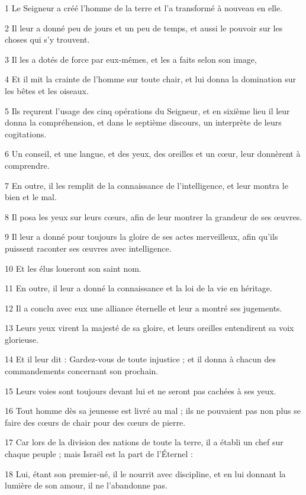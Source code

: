 \par 1 Le Seigneur a créé l'homme de la terre et l'a transformé à nouveau en elle.
\par 2 Il leur a donné peu de jours et un peu de temps, et aussi le pouvoir sur les choses qui s'y trouvent.
\par 3 Il les a dotés de force par eux-mêmes, et les a faits selon son image,
\par 4 Et il mit la crainte de l'homme sur toute chair, et lui donna la domination sur les bêtes et les oiseaux.
\par 5 Ils reçurent l'usage des cinq opérations du Seigneur, et en sixième lieu il leur donna la compréhension, et dans le septième discours, un interprète de leurs cogitations.
\par 6 Un conseil, et une langue, et des yeux, des oreilles et un cœur, leur donnèrent à comprendre.
\par 7 En outre, il les remplit de la connaissance de l'intelligence, et leur montra le bien et le mal.
\par 8 Il posa les yeux sur leurs cœurs, afin de leur montrer la grandeur de ses œuvres.
\par 9 Il leur a donné pour toujours la gloire de ses actes merveilleux, afin qu'ils puissent raconter ses œuvres avec intelligence.
\par 10 Et les élus loueront son saint nom.
\par 11 En outre, il leur a donné la connaissance et la loi de la vie en héritage.
\par 12 Il a conclu avec eux une alliance éternelle et leur a montré ses jugements.
\par 13 Leurs yeux virent la majesté de sa gloire, et leurs oreilles entendirent sa voix glorieuse.
\par 14 Et il leur dit : Gardez-vous de toute injustice ; et il donna à chacun des commandements concernant son prochain.
\par 15 Leurs voies sont toujours devant lui et ne seront pas cachées à ses yeux.
\par 16 Tout homme dès sa jeunesse est livré au mal ; ils ne pouvaient pas non plus se faire des cœurs de chair pour des cœurs de pierre.
\par 17 Car lors de la division des nations de toute la terre, il a établi un chef sur chaque peuple ; mais Israël est la part de l'Éternel :
\par 18 Lui, étant son premier-né, il le nourrit avec discipline, et en lui donnant la lumière de son amour, il ne l'abandonne pas.
